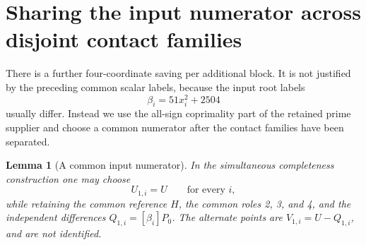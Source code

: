 \documentclass[11pt]{article}
\newtheorem{lemma}[theorem]{Lemma}
\begin{document}
\section{Sharing the input numerator across disjoint contact families}

There is a further four-coordinate saving per additional block.  It is
not justified by the preceding common scalar labels, because the input
root labels
\[
                      \beta_i=51x_i^2+2504
\]
usually differ.  Instead we use the all-sign coprimality part of the
retained prime supplier and choose a common numerator after the contact
families have been separated.

\begin{lemma}[A common input numerator]\label{lem:common-input-numerator}
In the simultaneous completeness construction one may choose
\[
               U_{1,i}=U\qquad\text{for every }i,
\]
while retaining the common reference \(H\), the common roles 2, 3, and 4,
and the independent differences \(Q_{1,i}=[\beta_i]P_0\).
The alternate points are \(V_{1,i}=U-Q_{1,i}\), and are not identified.
\end{lemma}
\end{document}
